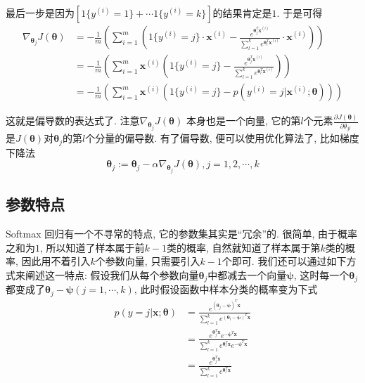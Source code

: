 \documentclass[a4paper,UTF8]{ctexart}
\theoremstyle{plain} \newtheorem{theorem}{定理}[section]
\theoremstyle{plain} \newtheorem{definition}{定义}[section]
\theoremstyle{plain} \newtheorem{lemma}{引理}[section]
\theoremstyle{plain} \newtheorem{proposition}{命题}[section]
\theoremstyle{plain} \newtheorem{example}{例}[section]
\theoremstyle{plain} \newtheorem{remark}{注}[section]
\theoremstyle{plain} \newtheorem{corollary}{推论}[section]
\newcommand{\p}[3]{\frac{\partial^{#1}#2}{\partial{#3}^{#1}}}  %
\begin{document}
最后一步是因为$[1\{y^{(i)}=1\} + \cdots 1\{y^{(i)}=k\}]$的结果肯定是$1$. 于是可得
\begin{align*}
\nabla_{\bm{\theta}_{j}} J(\bm{\theta}) & = - \frac{1}{m} \left( \sum_{i=1}^{m} \left( 1\{y^{(i)}=j\} \cdot \bm{x}^{(i)} - \frac{e^{\bm{\theta}_{j}^T \bm{x}^{(i)}}}{\sum_{l=1}^{k} e^{\bm{\theta}_{l}^T \bm{x}^{(i)}}} \cdot \bm{x}^{(i)} \right) \right) \\ 
& = - \frac{1}{m} \left( \sum_{i=1}^{m} \bm{x}^{(i)} \left( 1\{y^{(i)}=j\} - \frac{e^{\bm{\theta}_{j}^T \bm{x}^{(i)}}}{\sum_{l=1}^{k} e^{\bm{\theta}_{l}^T \bm{x}^{(i)}}} \right) \right) \\ 
& = - \frac{1}{m} \left( \sum_{i=1}^{m} \bm{x}^{(i)} \left( 1\{y^{(i)}=j\} - p(y^{(i)} = j | \bm{x}^{(i)}; \bm{\theta}) \right) \right)
\end{align*}

这就是偏导数的表达式了. 注意$\nabla_{\bm{\theta}_{j}} J(\bm{\theta})$ 本身也是一个向量, 它的第$l$个元素$\p{}{J(\bm{\theta})}{\theta_{jl}}$是$J(\bm{\theta})$对$\bm{\theta}_{j}$的第$l$个分量的偏导数. 有了偏导数, 便可以使用优化算法了, 比如梯度下降法
\begin{equation*}
\bm{\theta}_{j} := \bm{\theta}_{j} - \alpha \nabla_{\bm{\theta}_{j}} J(\bm{\theta}), j = 1,2,\cdots,k
\end{equation*}


\subsection{参数特点}
Softmax 回归有一个不寻常的特点, 它的参数集其实是“冗余”的. 很简单, 由于概率之和为$1$, 所以知道了样本属于前$k-1$类的概率, 自然就知道了样本属于第$k$类的概率, 因此用不着引入$k$个参数向量, 只需要引入$k-1$个即可. 我们还可以通过如下方式来阐述这一特点: 假设我们从每个参数向量$\bm{\theta}_{j}$中都减去一个向量$\bm{\psi}$, 这时每一个$\bm{\theta}_{j}$都变成了$\bm{\theta}_{j} - \bm{\psi}(j=1,\cdots,k)$, 此时假设函数中样本分类的概率变为下式
\begin{align*}
p(y = j | \bm{x}; \bm{\theta}) & = \frac{e^{(\bm{\theta}_{j} - \bm{\psi})^T \bm{x}}}{\sum_{l=1}^{k} e^{(\bm{\theta}_{l} - \bm{\psi})^T \bm{x}}} \\ 
& = \frac{e^{\bm{\theta}_{j}^{T} \bm{x}}  e^{- \bm{\psi}^T \bm{x}}}{\sum_{l=1}^{k} e^{\bm{\theta}_{l}^{T} \bm{x}}  e^{- \bm{\psi}^T \bm{x}}} \\ 
& = \frac{e^{\bm{\theta}_{j}^{T} \bm{x}} }{\sum_{l=1}^{k} e^{\bm{\theta}_{l}^{T} \bm{x}} } 
\end{align*}
\end{document}
